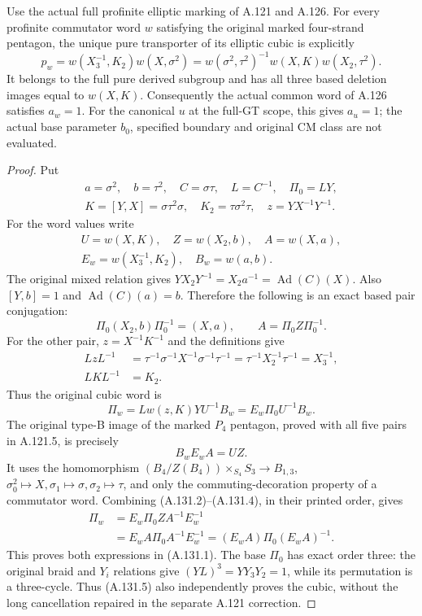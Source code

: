 Use the actual full profinite elliptic marking of A.121 and A.126.
For every profinite commutator word \(w\) satisfying the original
marked four-strand pentagon, the unique pure transporter of its
elliptic cubic is explicitly
\[
 p_w=w(X_3^{-1},K_2)w(X,\sigma^2)
     =w(\sigma^2,\tau^2)^{-1}w(X,K)w(X_2,\tau^2).
 \tag{A.131.1}
\]
It belongs to the full pure derived subgroup and has all three
based deletion images equal to \(w(X,K)\). Consequently the
actual common word of A.126 satisfies \(a_w=1\).
For the canonical \(u\) at the full-GT scope, this gives
\(a_u=1\); the actual base parameter \(b_0\), specified boundary
and original CM class are not evaluated.
\begin{proof}
Put
\[
\begin{gathered}
 a=\sigma^2,\quad b=\tau^2,\quad C=\sigma\tau,
 \quad L=C^{-1},\quad \Pi_0=LY,\\
 K=[Y,X]=\sigma\tau^2\sigma,\quad K_2=\tau\sigma^2\tau,
 \quad z=YX^{-1}Y^{-1}.
\end{gathered}
\]
For the word values write
\[
\begin{gathered}
 U=w(X,K),\quad Z=w(X_2,b),\quad A=w(X,a),\\
 E_w=w(X_3^{-1},K_2),\quad B_w=w(a,b).
\end{gathered}
\]
The original mixed relation gives
\(YX_2Y^{-1}=X_2a^{-1}=\operatorname{Ad}(C)(X)\).
Also \([Y,b]=1\) and \(\operatorname{Ad}(C)(a)=b\).
Therefore the following is an exact based pair conjugation:
\[
 \Pi_0(X_2,b)\Pi_0^{-1}=(X,a),\qquad
 A=\Pi_0Z\Pi_0^{-1}.                              \tag{A.131.2}
\]
For the other pair, \(z=X^{-1}K^{-1}\) and the definitions give
\[
\begin{aligned}
 LzL^{-1}
 &=\tau^{-1}\sigma^{-1}X^{-1}\sigma^{-1}\tau^{-1}
   =\tau^{-1}X_2^{-1}\tau^{-1}=X_3^{-1},\\
 LKL^{-1}&=K_2.
\end{aligned}
\]
Thus the original cubic word is
\[
 \Pi_w=Lw(z,K)YU^{-1}B_w=E_w\Pi_0U^{-1}B_w.
\tag{A.131.3}
\]
The original type-B image of the marked \(P_4\) pentagon,
proved with all five pairs in A.121.5, is precisely
\[
 B_wE_wA=UZ.                                         \tag{A.131.4}
\]
It uses the homomorphism
\((B_4/Z(B_4))\times_{S_4}S_3\to B_{1,3}\),
\(\sigma_0^2\mapsto X,\sigma_1\mapsto\sigma,
\sigma_2\mapsto\tau\), and only the commuting-decoration
property of a commutator word. Combining (A.131.2)--(A.131.4),
in their printed order, gives
\[
\begin{aligned}
 \Pi_w
 &=E_w\Pi_0ZA^{-1}E_w^{-1}\\
 &=E_wA\Pi_0A^{-1}E_w^{-1}
  =(E_wA)\Pi_0(E_wA)^{-1}.
\end{aligned}                                      \tag{A.131.5}
\]
This proves both expressions in (A.131.1). The base \(\Pi_0\)
has exact order three: the original braid and \(Y_i\) relations
give \((YL)^3=YY_3Y_2=1\), while its permutation is a three-cycle.
Thus (A.131.5) also independently proves the cubic, without the
long cancellation repaired in the separate A.121 correction.


\end{proof}
